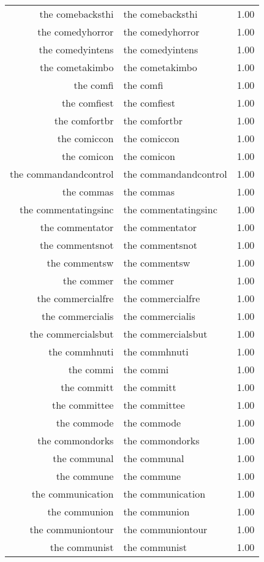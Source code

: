 \begin{table}[ht]
\begin{tabular}{rlr}
  the comebacksthi & the comebacksthi & 1.00 \\ 
  the comedyhorror & the comedyhorror & 1.00 \\ 
  the comedyintens & the comedyintens & 1.00 \\ 
  the cometakimbo & the cometakimbo & 1.00 \\ 
  the comfi & the comfi & 1.00 \\ 
  the comfiest & the comfiest & 1.00 \\ 
  the comfortbr & the comfortbr & 1.00 \\ 
  the comiccon & the comiccon & 1.00 \\ 
  the comicon & the comicon & 1.00 \\ 
  the commandandcontrol & the commandandcontrol & 1.00 \\ 
  the commas & the commas & 1.00 \\ 
  the commentatingsinc & the commentatingsinc & 1.00 \\ 
  the commentator & the commentator & 1.00 \\ 
  the commentsnot & the commentsnot & 1.00 \\ 
  the commentsw & the commentsw & 1.00 \\ 
  the commer & the commer & 1.00 \\ 
  the commercialfre & the commercialfre & 1.00 \\ 
  the commercialis & the commercialis & 1.00 \\ 
  the commercialsbut & the commercialsbut & 1.00 \\ 
  the commhnuti & the commhnuti & 1.00 \\ 
  the commi & the commi & 1.00 \\ 
  the committ & the committ & 1.00 \\ 
  the committee & the committee & 1.00 \\ 
  the commode & the commode & 1.00 \\ 
  the commondorks & the commondorks & 1.00 \\ 
  the communal & the communal & 1.00 \\ 
  the commune & the commune & 1.00 \\ 
  the communication & the communication & 1.00 \\ 
  the communion & the communion & 1.00 \\ 
  the communiontour & the communiontour & 1.00 \\ 
  the communist & the communist & 1.00 \\ 

\end{tabular}
\end{table}
